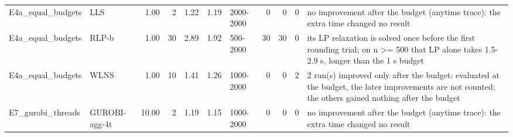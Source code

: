 \begin{table}[htbp]
\begin{tabular}{llrrrrlrrrl}
E4a\_equal\_budgets & LLS & 1.00 & 2 & 1.22 & 1.19 & 2000-2000 & 0 & 0 & 0 & no improvement after the budget (anytime trace): the extra time changed no result \\
E4a\_equal\_budgets & RLP-b & 1.00 & 30 & 2.89 & 1.92 & 500-2000 & 30 & 30 & 0 & its LP relaxation is solved once before the first rounding trial; on n >= 500 that LP alone takes 1.5-2.9 s, longer than the 1 s budget \\
E4a\_equal\_budgets & WLNS & 1.00 & 10 & 1.41 & 1.26 & 1000-2000 & 0 & 0 & 2 & 2 run(s) improved only after the budget: evaluated at the budget, the later improvements are not counted; the others gained nothing after the budget \\
E7\_gurobi\_threads & GUROBI-agg-4t & 10.00 & 2 & 1.19 & 1.15 & 1000-2000 & 0 & 0 & 0 & no improvement after the budget (anytime trace): the extra time changed no result \\
\bottomrule
\end{tabular}
\end{table}

